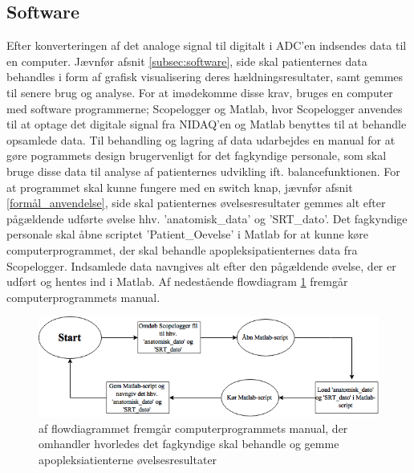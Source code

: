\subsection{Software}
Efter konverteringen af det analoge signal til digitalt i ADC’en indsendes data til en computer. Jævnfør afsnit \ref{subsec:software}, side \pageref{subsec:software} skal patienternes data behandles i form af grafisk visualisering deres hældningsresultater, samt gemmes til senere brug og analyse. For at imødekomme disse krav, bruges en computer med software programmerne; Scopelogger og Matlab, hvor Scopelogger anvendes til at optage det  digitale signal fra NIDAQ'en og Matlab benyttes til at behandle opsamlede data. Til behandling og lagring af data udarbejdes en manual for at gøre pogrammets design brugervenligt for det fagkyndige personale, som skal bruge disse data til analyse af patienternes udvikling ift. balancefunktionen. For at programmet skal kunne fungere med en switch knap, jævnfør afsnit \ref{formål_anvendelse}, side \pageref{formål_anvendelse} skal patienternes øvelsesresultater gemmes alt efter pågældende udførte øvelse hhv. 'anatomisk_data' og 'SRT_dato'. 
Det fagkyndige personale skal åbne scriptet 'Patient_Oevelse' i Matlab for at kunne køre computerprogrammet, der skal behandle apopleksipatienternes data fra Scopelogger. Indsamlede data navngives alt efter den pågældende øvelse, der er udført og hentes ind i Matlab. Af nedestående flowdiagram \ref{Flow_manual} fremgår computerprogrammets manual.

\begin{figure}[H] 
	\centering 
	\includegraphics[scale=0.5]{figures/cProblemloesning/Flow_manual.PNG}
	\caption{af flowdiagrammet fremgår computerprogrammets manual, der omhandler hvorledes det fagkyndige skal behandle og gemme apopleksiatienterne øvelsesresultater}
	\label{Flow_manual}
\end{figure} 



